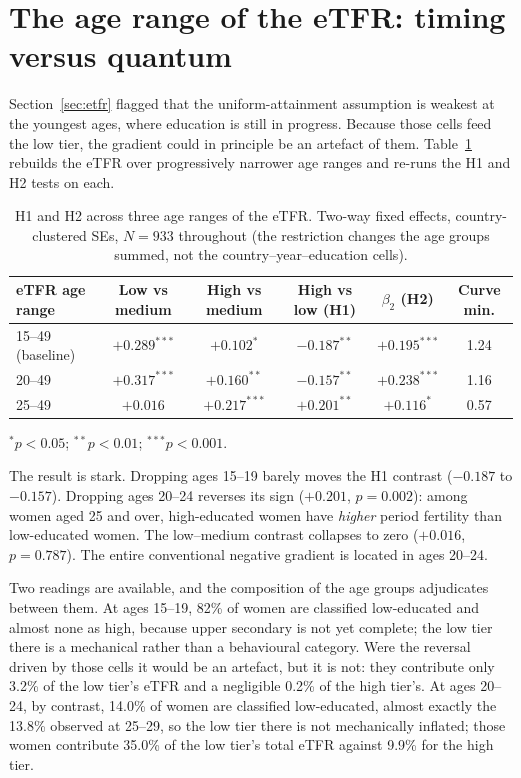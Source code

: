 \documentclass[12pt,a4paper]{report}
\begin{document}
\section{The age range of the eTFR: timing versus quantum}
\label{sec:agefloor}
Section~\ref{sec:etfr} flagged that the uniform-attainment assumption is weakest at the youngest
ages, where education is still in progress. Because those cells feed the low tier, the gradient
could in principle be an artefact of them. Table~\ref{tab:agefloor} rebuilds the eTFR over
progressively narrower age ranges and re-runs the H1 and H2 tests on each.

\begin{table}[ht]
\centering
\caption{H1 and H2 across three age ranges of the eTFR. Two-way fixed effects, country-clustered SEs, $N=933$ throughout (the restriction changes the age groups summed, not the country--year--education cells).}
\label{tab:agefloor}
\small
\begin{tabular}{@{}lccccc@{}}
\toprule
eTFR age range & Low vs medium & High vs medium & High vs low (H1) & $\beta_2$ (H2) & Curve min. \\
\midrule
15--49 (baseline) & $+0.289^{***}$ & $+0.102^{*}$   & $-0.187^{**}$ & $+0.195^{***}$ & 1.24 \\
20--49            & $+0.317^{***}$ & $+0.160^{**}$  & $-0.157^{**}$ & $+0.238^{***}$ & 1.16 \\
25--49            & $+0.016$       & $+0.217^{***}$ & $+0.201^{**}$ & $+0.116^{*}$   & 0.57 \\
\bottomrule
\end{tabular}

\vspace{0.5em}
\footnotesize{$^{*}p<0.05$; $^{**}p<0.01$; $^{***}p<0.001$.}
\end{table}

The result is stark. Dropping ages 15--19 barely moves the H1 contrast ($-0.187$ to $-0.157$).
Dropping ages 20--24 reverses its sign ($+0.201$, $p=0.002$): among women aged 25 and over,
high-educated women have \emph{higher} period fertility than low-educated women. The
low--medium contrast collapses to zero ($+0.016$, $p=0.787$). The entire conventional negative
gradient is located in ages 20--24.

Two readings are available, and the composition of the age groups adjudicates between them. At
ages 15--19, 82\% of women are classified low-educated and almost none as high, because
upper secondary is not yet complete; the low tier there is a mechanical rather than a behavioural
category. Were the reversal driven by those cells it would be an artefact, but it is not: they
contribute only 3.2\% of the low tier's eTFR and a negligible 0.2\% of the high tier's. At ages
20--24, by contrast, 14.0\% of women are classified low-educated, almost exactly the 13.8\% observed
at 25--29, so the low tier there is not mechanically inflated; those women contribute 35.0\% of the low
tier's total eTFR against 9.9\% for the high tier.
\end{document}
